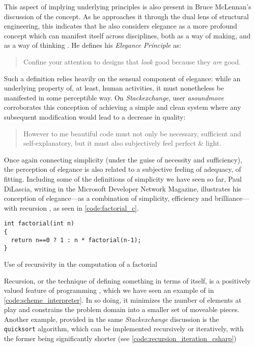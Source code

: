 This aspect of implying underlying principles is also present in Bruce McLennan's discussion of the concept. As he approaches it through the dual lens of structural engineering, this indicates that he also considers elegance as a more profound concept which can manifest itself across disciplines, both as a way of making, and as a way of thinking \citep{mclennan_who_1997}. He defines his \emph{Elegance Principle} as:

\begin{quote}
  Confine your attention to designs that \emph{look} good because they \emph{are} good. \citep{mclennan_who_1997}
\end{quote}

Such a definition relies heavily on the sensual component of elegance: while an underlying property of, at least, human activities, it must nonetheless be manifested in some perceptible way. On \emph{Stackexchange}, user \emph{asoundmove} corroborates this conception of achieving a simple and clean system where any subsequent modification would lead to a decrease in quality:

\begin{quote}
  However to me beautiful code must not only be necessary, sufficient and self-explanatory, but it must also subjectively feel perfect \& light. \citep{stack_}
\end{quote}

Once again connecting simplicity (under the guise of necessity and sufficiency), the perception of elegance is also related to a subjective feeling of adequacy, of fitting. Including some of the definitions of simplicity we have seen so far, Paul DiLascia, writing in the Microsoft Developer Network Magazine, illustrates his conception of elegance—as a combination of simplicity, efficiency and brilliance—with recursion \citep{dilascia_end_2019}, as seen in \ref{code:factorial_c}.

\begin{listing}
  \begin{verbatim}
int factorial(int n)
{
  return n==0 ? 1 : n * factorial(n-1);
}
\end{verbatim}
  \caption{Use of recursivity in the computation of a factorial}
  \label{code:factorial_c}
\end{listing}

Recursion, or the technique of defining something in terms of itself, is a positively valued feature of programming \citep{abelson_structure_1979}, which we have seen an example of in \ref{code:scheme_interpreter}. In so doing, it minimizes the number of elements at play and constrains the problem domain into a smaller set of moveable pieces. Another example, provided in the same \emph{Stackexchange} discussion is the \lstinline{quicksort} algorithm, which can be implemented recursively or iteratively, with the former being significantly shorter (see \ref{code:recursion_iteration_csharp})

